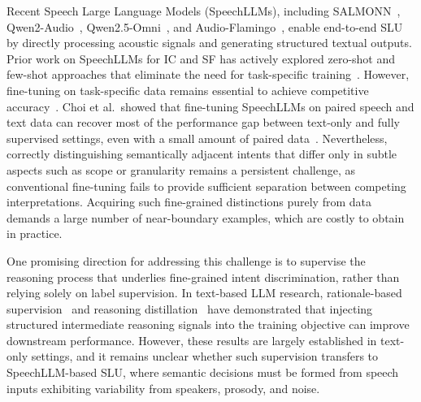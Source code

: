 \documentclass[cameraready]{Interspeech}
\begin{document}
Recent Speech Large Language Models (SpeechLLMs), including
SALMONN~\cite{tang2024salmonn}, Qwen2-Audio~\cite{chu2024qwen2},
Qwen2.5-Omni~\cite{xu2025qwen25omni}, and
Audio-Flamingo~\cite{goel2025audioflamingo3}, enable end-to-end SLU by
directly processing acoustic signals and generating structured textual
outputs.
Prior work on SpeechLLMs for IC and SF has actively explored
zero-shot and few-shot approaches that eliminate the need for
task-specific training~\cite{LiKeizerDoddipatla2024PromptingWhisperQASLU,
hacioglu2025speechllms, AgrawalGanapathy2025SLUUnseenICL}.
However, fine-tuning on task-specific data remains essential to achieve
competitive accuracy~\cite{li2024whisma}.
Choi et al.\ showed that fine-tuning SpeechLLMs on paired speech and
text data can recover most of the performance gap between text-only and
fully supervised settings, even with a small amount of paired
data~\cite{choi2025exploring}.
Nevertheless, correctly distinguishing semantically adjacent intents
that differ only in subtle aspects such as scope or granularity remains
a persistent challenge, as conventional fine-tuning fails to provide
sufficient separation between competing interpretations.
Acquiring such fine-grained distinctions purely from data demands a
large number of near-boundary examples, which are costly to obtain in
practice.



One promising direction for addressing this challenge is to supervise
the reasoning process that underlies fine-grained intent discrimination,
rather than relying solely on label supervision.
In text-based LLM research, rationale-based
supervision~\cite{zaidan-etal-2007-using,10.5555/1613715.1613721,lei-etal-2016-rationalizing}
and reasoning
distillation~\cite{magister-etal-2023-teaching,HoSchmidYun2023ReasoningTeachers,Fu2022ComplexityBasedPF,hsieh-etal-2023-distilling,zelikman2022starbootstrappingreasoningreasoning}
have demonstrated that injecting structured intermediate reasoning
signals into the training objective can improve downstream performance.
However, these results are largely established in text-only settings,
and it remains unclear whether such supervision transfers to
SpeechLLM-based SLU, where semantic decisions must be formed from
speech inputs exhibiting variability from speakers, prosody, and noise.
\end{document}
